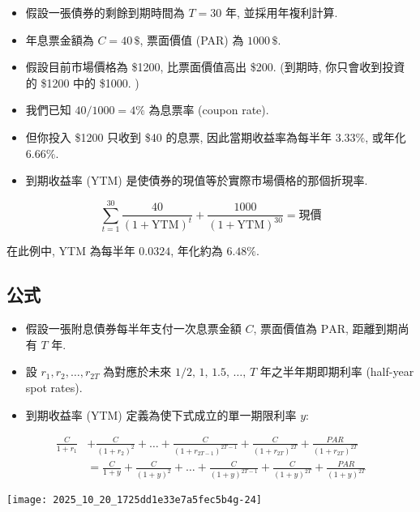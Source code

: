 \documentclass[letterpaper]{article}
\begin{document}
		\begin{itemize}
			\item 假設一張債券的剩餘到期時間為 \(T = 30\) 年, 並採用年複利計算.  
			\item 年息票金額為 \(C = 40\, \$\), 票面價值 (PAR) 為 \(1000\, \$\).  
			\item 假設目前市場價格為 \$1200, 比票面價值高出 \$200.   (到期時, 你只會收到投資的 \$1200 中的 \$1000.  ) 
			\item 我們已知 \(40 / 1000 = 4\%\) 為息票率 (coupon rate).  
			\item 但你投入 \$1200 只收到 \$40 的息票, 因此當期收益率為每半年 \(3.33\%\), 或年化 \(6.66\%\).  
			\item 到期收益率 (YTM) 是使債券的現值等於實際市場價格的那個折現率.  
		\end{itemize}
		
		$$
		\sum_{t=1}^{30} \frac{40}{(1+\text{YTM})^{t}} + \frac{1000}{(1+\text{YTM})^{30}} = \text{現價}
		$$
		
		在此例中, YTM 為每半年 \(0.0324\), 年化約為 \(6.48\%\).  
		
		
		\subsection{公式}
		\begin{itemize}
			\item 假設一張附息債券每半年支付一次息票金額 \(C\), 票面價值為 \(\mathrm{PAR}\), 距離到期尚有 \(T\) 年.  
			\item 設 \(r_{1}, r_{2}, \ldots, r_{2T}\) 為對應於未來 \(1/2, \, 1, \, 1.5, \, \ldots, \, T\) 年之半年期即期利率 (half-year spot rates).  
			\item 到期收益率 (YTM) 定義為使下式成立的單一期限利率 \(y\): 
		\end{itemize}
		
		$$
		\begin{aligned}
			\frac{C}{1+r_{1}} & +\frac{C}{\left (1+r_{2}\right) ^{2}}+\ldots+\frac{C}{\left (1+r_{2 T-1}\right) ^{2 T-1}}+\frac{C}{\left (1+r_{2 T}\right) ^{2 T}}+\frac{P A R}{\left (1+r_{2 T}\right) ^{2 T}} \\
			& =\frac{C}{1+y}+\frac{C}{ (1+y) ^{2}}+\ldots+\frac{C}{ (1+y) ^{2 T-1}}+\frac{C}{ (1+y) ^{2 T}}+\frac{P A R}{ (1+y) ^{2 T}}
		\end{aligned}
		$$
		
		\texttt{[image: 2025\_10\_20\_1725dd1e33e7a5fec5b4g-24]}
		
\end{document}

